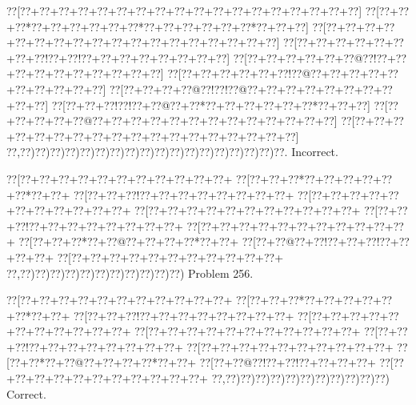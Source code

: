 \documentclass[a5paper]{article}
\begin{document}
\begin{center}
{\goo
\0??[\0??+\0??+\0??+\0??+\0??+\0??+\0??+\0??+\0??+\0??+\0??+\0??+\0??+\0??+\0??+\0??+\0??+\0??]
\0??[\0??+\0??+\0??*\0??+\0??+\0??+\0??+\0??+\0??*\0??+\0??+\0??+\0??+\0??+\0??*\0??+\0??+\0??]
\0??[\0??+\0??+\0??+\0??+\0??+\0??+\0??+\0??+\0??+\0??+\0??+\0??+\0??+\0??+\0??+\0??+\0??+\0??]
\0??[\0??+\0??+\0??+\0??+\0??+\0??+\0??+\0??!\0??+\0??!\0??+\0??+\0??+\0??+\0??+\0??+\0??+\0??]
\0??[\0??+\0??+\0??+\0??+\0??+\0??@\0??!\0??+\0??+\0??+\0??+\0??+\0??+\0??+\0??+\0??+\0??]
\0??[\0??+\0??+\0??+\0??+\0??+\0??!\0??@\0??+\0??+\0??+\0??+\0??+\0??+\0??+\0??+\0??+\0??]
\0??[\0??+\0??+\0??+\0??@\0??!\0??!\0??@\0??+\0??+\0??+\0??+\0??+\0??+\0??+\0??+\0??+\0??]
\0??[\0??+\0??+\0??!\0??!\0??+\0??@\0??+\0??*\0??+\0??+\0??+\0??+\0??+\0??*\0??+\0??+\0??]
\0??[\0??+\0??+\0??+\0??+\0??@\0??+\0??+\0??+\0??+\0??+\0??+\0??+\0??+\0??+\0??+\0??+\0??+\0??]
\0??[\0??+\0??+\0??+\0??+\0??+\0??+\0??+\0??+\0??+\0??+\0??+\0??+\0??+\0??+\0??+\0??+\0??+\0??]
\0??,\0??)\0??)\0??)\0??)\0??)\0??)\0??)\0??)\0??)\0??)\0??)\0??)\0??)\0??)\0??)\0??)\0??)\0??.
}
Incorrect. 

\end{center}
\newpage
\begin{center}
{\goo
\0??[\0??+\0??+\0??+\0??+\0??+\0??+\0??+\0??+\0??+\0??+\0??+
\0??[\0??+\0??+\0??*\0??+\0??+\0??+\0??+\0??+\0??*\0??+\0??+
\0??[\0??+\0??+\0??!\0??+\0??+\0??+\0??+\0??+\0??+\0??+\0??+
\0??[\0??+\0??+\0??+\0??+\0??+\0??+\0??+\0??+\0??+\0??+\0??+
\0??[\0??+\0??+\0??+\0??+\0??+\0??+\0??+\0??+\0??+\0??+\0??+
\0??[\0??+\0??+\0??!\0??+\0??+\0??+\0??+\0??+\0??+\0??+\0??+
\0??[\0??+\0??+\0??+\0??+\0??+\0??+\0??+\0??+\0??+\0??+\0??+
\0??[\0??+\0??+\0??*\0??+\0??@\0??+\0??+\0??+\0??*\0??+\0??+
\0??[\0??+\0??@\0??+\0??!\0??+\0??+\0??!\0??+\0??+\0??+\0??+
\0??[\0??+\0??+\0??+\0??+\0??+\0??+\0??+\0??+\0??+\0??+\0??+
\0??,\0??)\0??)\0??)\0??)\0??)\0??)\0??)\0??)\0??)\0??)\0??)
}
Problem 256.

\end{center}
\begin{center}
{\goo
\0??[\0??+\0??+\0??+\0??+\0??+\0??+\0??+\0??+\0??+\0??+\0??+
\0??[\0??+\0??+\0??*\0??+\0??+\0??+\0??+\0??+\0??*\0??+\0??+
\0??[\0??+\0??+\0??!\0??+\0??+\0??+\0??+\0??+\0??+\0??+\0??+
\0??[\0??+\0??+\0??+\0??+\0??+\0??+\0??+\0??+\0??+\0??+\0??+
\0??[\0??+\0??+\0??+\0??+\0??+\0??+\0??+\0??+\0??+\0??+\0??+
\0??[\0??+\0??+\0??!\0??+\0??+\0??+\0??+\0??+\0??+\0??+\0??+
\0??[\0??+\0??+\0??+\0??+\0??+\0??+\0??+\0??+\0??+\0??+
\0??[\0??+\0??*\0??+\0??@\0??+\0??+\0??+\0??*\0??+\0??+
\0??[\0??+\0??@\0??!\0??+\0??!\0??+\0??+\0??+\0??+
\0??[\0??+\0??+\0??+\0??+\0??+\0??+\0??+\0??+\0??+\0??+\0??+
\0??,\0??)\0??)\0??)\0??)\0??)\0??)\0??)\0??)\0??)\0??)\0??)
}
Correct. 

\end{center}
\end{document}
